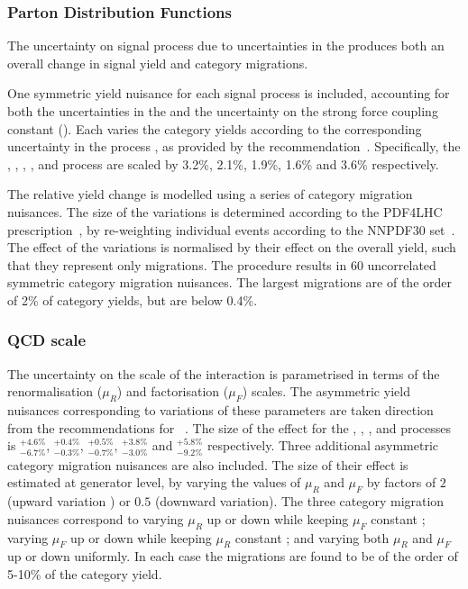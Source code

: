 \subsubsection{Parton Distribution Functions}

The uncertainty on signal process \crosssection\s due to uncertainties in the \PDF produces both an overall change in signal yield and category migrations.

One symmetric yield nuisance for each signal process is included, accounting for both the uncertainties in the \PDF\s and the uncertainty on the strong force coupling constant (\alphaS). Each varies the category yields according to the corresponding uncertainty in the process \crosssection, as provided by the \LHCHXSWG recommendation~\cite{LHCHXSWGYR4}. Specifically, the \ggH, \VBF, \WH, \ZH, and \ttH process \crosssection\s are scaled by 3.2\%, 2.1\%, 1.9\%, 1.6\% and 3.6\% respectively. 

The relative yield change is modelled using a series of category migration nuisances. The size of the variations is determined according to the PDF4LHC prescription~\cite{Demartin:2010er}, by re-weighting individual events according to the NNPDF30 \PDF set~\cite{Carrazza:2015aoa}. The effect of the variations is normalised by their effect on the overall yield, such that they represent only migrations. The procedure results in 60 uncorrelated symmetric category migration nuisances. The largest migrations are of the order of 2\% of category yields, but are below 0.4\%.

\subsubsection{QCD scale}
The uncertainty on the scale of the \QCD interaction is parametrised in terms of the renormalisation ($\mu_{R}$) and factorisation ($\mu_{F}$) scales. The asymmetric yield nuisances corresponding to variations of these parameters are taken direction from the \LHCHXSWG recommendations for \crosssection\s~\cite{LHCHXSWGYR4}. The size of the effect for the \ggH, \VBF, \WH, \ZH and \ttH processes is $^{+4.6\%}_{-6.7\%}$, $^{+0.4\%}_{-0.3\%}$, $^{+0.5\%}_{-0.7\%}$, $^{+3.8\%}_{-3.0\%}$ and $^{+5.8\%}_{-9.2\%}$ respectively. Three additional asymmetric category migration nuisances are also included. The size of their effect is estimated at generator level, by varying the values of $\mu_{R}$ and $\mu_{F}$ by factors of $2$ (upward variation ) or $0.5$ (downward variation). The three category migration nuisances correspond to varying $\mu_{R}$ up or down while keeping $\mu_{F}$ constant ; varying $\mu_{F}$ up or down while keeping $\mu_{R}$ constant ; and varying both $\mu_{R}$ and $\mu_{F}$ up or down uniformly. In each case the migrations are found to be of the order of 5-10\% of the category yield.

